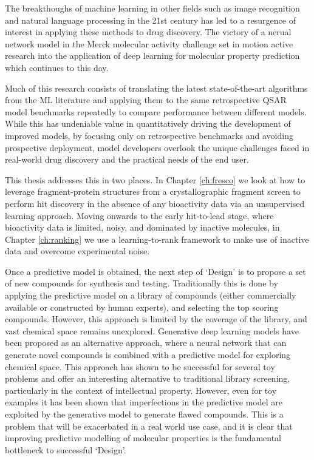 The breakthoughs of machine learning in other fields such as image recognition and natural language processing in the 21st century has led to a resurgence of interest in applying these methods to drug discovery. The victory of a nerual network model in the Merck molecular activity challenge set in motion active research into the application of deep learning for molecular property prediction which continues to this day.

Much of this research consists of translating the latest state-of-the-art algorithms from the ML literature and applying them to the same retrospective QSAR model benchmarks repeatedly to compare performance between different models. While this has undeniable value in quantitatively driving the development of improved models, by focusing only on retrospective benchmarks and avoiding prospective deployment, model developers overlook the unique challenges faced in real-world drug discovery and the practical needs of the end user.

This thesis addresses this in two places. In Chapter \ref{ch:fresco} we look at how to leverage fragment-protein structures from a crystallographic fragment screen to perform hit discovery in the absence of any bioactivity data via an unsupervised learning approach. Moving onwards to the early hit-to-lead stage, where bioactivity data is limited, noisy, and dominated by inactive molecules, in Chapter \ref{ch:ranking} we use a learning-to-rank framework to make use of inactive data and overcome experimental noise.

Once a predictive model is obtained, the next step of `Design' is to propose a set of new compounds for synthesis and testing. Traditionally this is done by applying the predictive model on a library of compounds (either commercially available or constructed by human experts), and selecting the top scoring compounds. However, this approach is limited by the coverage of the library, and vast chemical space remains unexplored. Generative deep learning models have been proposed as an alternative approach, where a neural network that can generate novel compounds is combined with a predictive model for exploring chemical space. This approach has shown to be successful for several toy problems and offer an interesting alternative to traditional library screening, particularly in the context of intellectual property. However, even for toy examples it has been shown that imperfections in the predictive model are exploited by the generative model to generate flawed compounds. This is a problem that will be exacerbated in a real world use case, and it is clear that improving predictive modelling of molecular properties is the fundamental bottleneck to successful `Design'.

